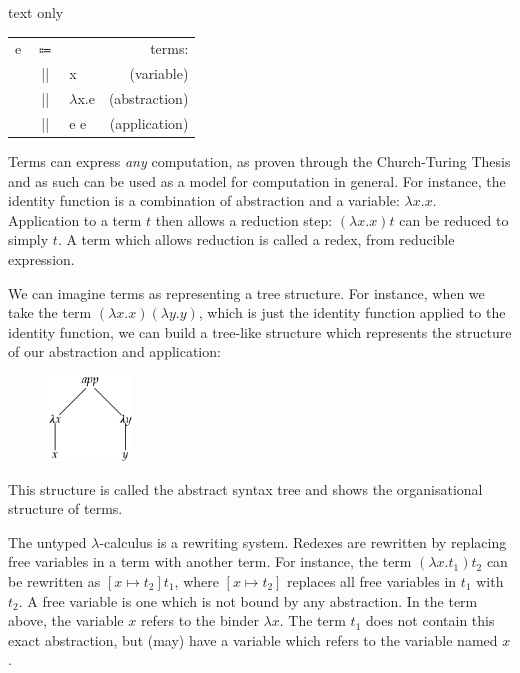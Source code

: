 \begin{changemargin}{1cm}{0cm}
\begin{expansionno}{text only}
\begin{tabular}{lclr}
e       & $\Coloneqq$ &                 & terms: \\
        & ||     & x                     & (variable) \\
        & ||     & $\lambda$x.e         & (abstraction) \\
        & ||     & e e                   & (application) \\
\end{tabular}
\end{expansionno}
\end{changemargin}

Terms can express \textit{any} computation, as proven through the Church-Turing Thesis and as such can be used as a model for computation in general.
For instance, the identity function is a combination of abstraction and a variable: $\lambda x.x$.
Application to a term $t$ then allows a reduction step: $(\lambda x.x) t$ can be reduced to simply $t$.
A term which allows reduction is called a redex, from reducible expression.

We can imagine terms as representing a tree structure.
For instance, when we take the term $(\lambda x.x) (\lambda y.y)$, which is just the identity function applied to the identity function, we can build a tree-like structure which represents the structure of our abstraction and application:\\
\begin{figure}[h]
\centering
\includegraphics[width=0.2\textwidth]{images/tree}\\
\end{figure}
This structure is called the abstract syntax tree and shows the organisational structure of terms.

The untyped $\lambda$-calculus is a rewriting system. 
Redexes are rewritten by replacing free variables in a term with another term.
For instance, the term $(\lambda x.t_1) t_2$ can be rewritten as $[x \mapsto t_2] t_1$, where $[x \mapsto t_2]$ replaces all free variables in $t_1$ with $t_2$.
A free variable is one which is not bound by any abstraction. 
In the term above, the variable $x$ refers to the binder $\lambda x$.
The term $t_1$ does not contain this exact abstraction, but (may) have a variable which refers to the variable named $x$.

